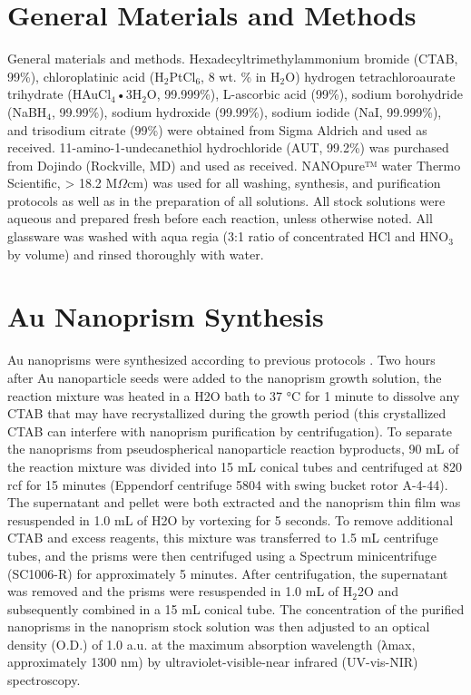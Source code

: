 \documentclass [11pt, proquest] {uwthesis}[2016/11/22]
\begin{document}
\section{General Materials and Methods}

General materials and methods. Hexadecyltrimethylammonium bromide (CTAB, 99\%), chloroplatinic acid (H$_2$PtCl$_6$, 8 wt. \% in H$_2$O) hydrogen tetrachloroaurate trihydrate (HAuCl$_4$•3H$_2$O, 99.999\%), L-ascorbic acid (99\%), sodium borohydride (NaBH$_4$, 99.99\%), sodium hydroxide (99.99\%), sodium iodide (NaI, 99.999\%), and trisodium citrate (99\%) were obtained from Sigma Aldrich and used as received. 11-amino-1-undecanethiol hydrochloride (AUT, 99.2\%) was purchased from Dojindo (Rockville, MD) and used as received. NANOpure™ water Thermo Scientific, > 18.2 M$\Omega$cm) was used for all washing, synthesis, and purification protocols as well as in the preparation of all solutions. All stock solutions were aqueous and prepared fresh before each reaction, unless otherwise noted. All glassware was washed with aqua regia (3:1 ratio of concentrated HCl and HNO$_3$ by volume) and rinsed thoroughly with water.

\section{Au Nanoprism Synthesis}

Au nanoprisms were synthesized according to previous protocols \cite{MillstoneIodide,MillstonePtAu}.  Two hours after Au nanoparticle seeds were added to the nanoprism growth solution, the reaction mixture was heated in a H2O bath to 37 °C for 1 minute to dissolve any CTAB that may have recrystallized during the growth period (this crystallized CTAB can interfere with nanoprism purification by centrifugation). To separate the nanoprisms from pseudospherical nanoparticle reaction byproducts, 90 mL of the reaction mixture was divided into 15 mL conical tubes and
centrifuged at 820 rcf for 15 minutes (Eppendorf centrifuge 5804 with swing bucket rotor A-4-44). The supernatant and pellet were both extracted and the nanoprism thin film was resuspended in 1.0 mL of H2O by vortexing for 5 seconds. To remove additional CTAB and excess reagents, this mixture was transferred to 1.5 mL centrifuge tubes, and the prisms were then centrifuged using a Spectrum minicentrifuge (SC1006-R) for approximately 5 minutes. After centrifugation, the supernatant was removed and the prisms were resuspended in 1.0 mL of H$_2$2O and subsequently combined in a 15 mL conical tube. The concentration of the purified nanoprisms in the nanoprism stock solution was then adjusted to an optical density (O.D.) of 1.0 a.u. at the maximum absorption wavelength (λmax, approximately 1300 nm) by ultraviolet-visible-near infrared (UV-vis-NIR) spectroscopy.
\end{document}
